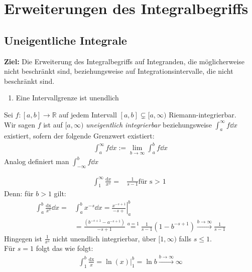 \section{Erweiterungen des Integralbegriffs}

\subsection{Uneigentliche Integrale}

\textbf{Ziel:} Die Erweiterung des Integralbegriffs auf Integranden, die 
möglicherweise nicht beschränkt sind, beziehungsweise auf Integrationsintervalle, 
die nicht beschränkt sind.

\begin{enumerate}
	\item Eine Intervallgrenze ist unendlich
\end{enumerate}

\begin{Definition}{
	Sei $f : [a,b] \rightarrow \mathbb{R}$ auf jedem Intervall $[a,b] \subsetneq
	[a, \infty)$ Riemann-integrierbar. \\
	Wir sagen $f$ ist auf $[a, \infty)$ \emph{uneigentlich integrierbar} 
	beziehungsweise $\int_a^{\infty} f \dd{x}$ existiert, sofern der 
	folgende Grenzwert existiert:
	\begin{align*}
		\int_a^{\infty} f \dd{x} := \lim\limits_{b \rightarrow \infty}
			{\int_a^b f \dd{x}}
	\end{align*}
	Analog definiert man $\int_{-\infty}^b f \dd{x}$
}\end{Definition}

\begin{Beispiel}{
	\begin{align*}
		\int_1^{\infty} \frac{\mathrm{d}x}{x^s} = & \frac{1}{s-1} \text{für s > 1 }
	\end{align*}
	Denn: für $b > 1$ gilt:
	\begin{align*}
		\int_a^b \frac{\mathrm{dx}}{x^s} \dd{x} = & \int_a^b x^{-s} \dd{x}
		  = \left.\frac{x^{-s+1}}{-s+} \right\vert_a^b \\
		  & = \frac{\left( b^{-s+1} - a^{-s+1}\right)}{-s+1} \overset{a = 1}{=}
		  \frac{1}{s-1}\left(1-b^{-s+1}\right) 
		  \overset{b \rightarrow \infty}{\longrightarrow}
		  \frac{1}{s-1}
	\end{align*}
	Hingegen ist $\frac{1}{x^s}$ nicht unendlich integrierbar, über $[1, \infty)$ 
	falls $s \leq 1$.\\
	Für $s=1$ folgt das wie folgt:
	\begin{align*}
		\int_1^b \frac{\mathrm{dx}}{x} = \left. \ln(x) \right\vert_1^b 
		= \ln b \overset{b \rightarrow \infty}{\longrightarrow} \infty
	\end{align*}
}\end{Beispiel}

